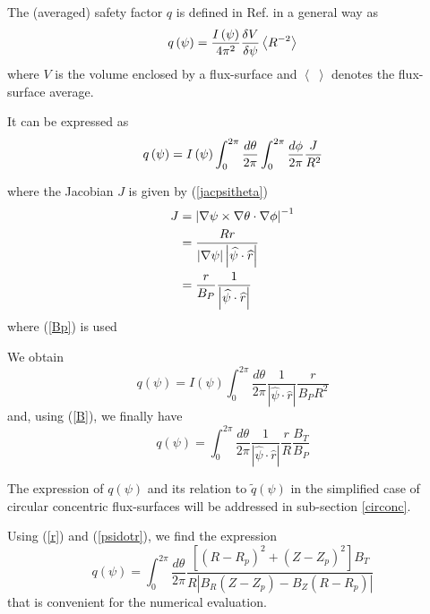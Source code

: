 The (averaged) safety factor $q$ is defined in Ref. \cite{dha90} in a
general way as 
\begin{equation}
q\left( \psi \right) =\frac{I\left( \psi \right) }{4\pi ^{2}}\frac{\delta V}{%
\delta \psi }\left\langle R^{-2}\right\rangle
\end{equation}
  where $V$ is the volume enclosed by a flux-surface and $%
\left\langle \;\right\rangle $ denotes the flux-surface average. %

It can be expressed as 
\begin{equation}
q\left( \psi \right) =I\left( \psi \right) \int_{0}^{2\pi }\frac{d\theta }{%
2\pi }\int_{0}^{2\pi }\frac{d\phi }{2\pi }\frac{J}{R^{2}}
\end{equation}

where the Jacobian $J$ is given by (\ref{jacpsitheta}) 
\begin{align}
J& =\left| \nabla \psi \times \nabla \theta \cdot \nabla \phi \right| ^{-1} 
\notag \\
& =\frac{Rr}{\left| \nabla \psi \right| \left| \widehat{\psi }\cdot \widehat{%
r}\right| }  \notag \\
& =\frac{r}{B_{P}}\frac{1}{\left| \widehat{\psi }\cdot \widehat{r}\right| }
\end{align}
where (\ref{Bp}) is used

We obtain 
\begin{equation}
q\left( \psi\right) =I\left( \psi\right) \int_{0}^{2\pi}\frac{d\theta}{ 2\pi}%
\frac{1}{\left| \widehat{\psi}\cdot\widehat{r}\right| }\frac{r}{ B_{P}R^{2}}
\end{equation}
and, using (\ref{B}), we finally have 
\begin{equation}
q\left( \psi\right) =\int_{0}^{2\pi}\frac{d\theta}{2\pi}\frac{1}{\left| 
\widehat{\psi}\cdot\widehat{r}\right| }\frac{r}{R}\frac{B_{T}}{B_{P}}
\label{qfactor}
\end{equation}

The expression of $q\left( \psi \right) $ and its relation to $\widetilde{q}%
\left( \psi \right) $ in the simplified case of circular concentric
flux-surfaces will be addressed in sub-section \ref{circonc}.

Using (\ref{r}) and (\ref{psidotr}), we find the expression 
\begin{equation}
q\left( \psi \right) =\int_{0}^{2\pi }\frac{d\theta }{2\pi }\frac{\left[
\left( R-R_{p}\right) ^{2}+\left( Z-Z_{p}\right) ^{2}\right] B_{T}}{R\left|
B_{R}\left( Z-Z_{p}\right) -B_{Z}\left( R-R_{p}\right) \right| }
\label{qfactor2}
\end{equation}
that is convenient for the numerical evaluation.

